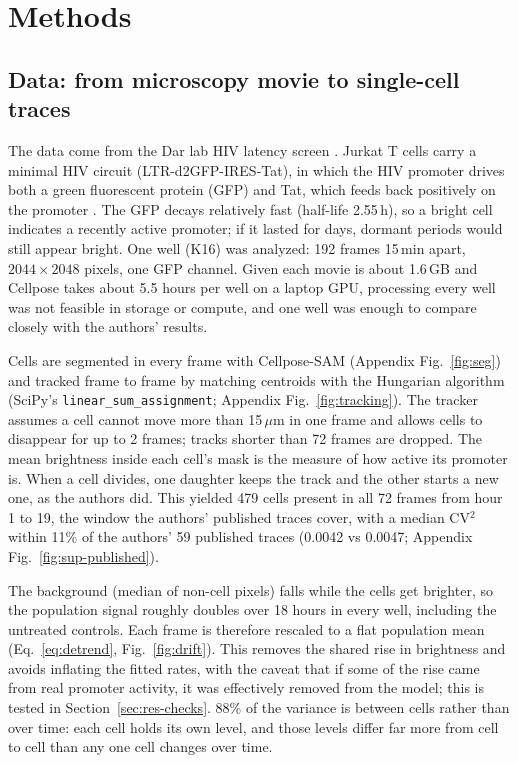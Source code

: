 \chapter{Methods}\label{ch:methods}

\section{Data: from microscopy movie to single-cell traces}\label{sec:data}

The data come from the Dar lab HIV latency screen \cite{lu2021,idb_dataset}. Jurkat T cells carry a minimal HIV circuit (LTR-d2GFP-IRES-Tat), in which the HIV promoter drives both a green fluorescent protein (GFP) and Tat, which feeds back positively on the promoter \cite{weinberger2005}. The GFP decays relatively fast (half-life 2.55\,h), so a bright cell indicates a recently active promoter; if it lasted for days, dormant periods would still appear bright. One well (K16) was analyzed: 192 frames 15\,min apart, $2044\times2048$ pixels, one GFP channel. Given each movie is about 1.6\,GB and Cellpose takes about 5.5 hours per well on a laptop GPU, processing every well was not feasible in storage or compute, and one well was enough to compare closely with the authors' results.

Cells are segmented in every frame with Cellpose-SAM \cite{pachitariu2025} (Appendix Fig.~\ref{fig:seg}) and tracked frame to frame by matching centroids with the Hungarian algorithm (SciPy's \texttt{linear\_sum\_assignment}; Appendix Fig.~\ref{fig:tracking}). The tracker assumes a cell cannot move more than 15\,$\mu$m in one frame and allows cells to disappear for up to 2 frames; tracks shorter than 72 frames are dropped. The mean brightness inside each cell's mask is the measure of how active its promoter is. When a cell divides, one daughter keeps the track and the other starts a new one, as the authors did. This yielded 479 cells present in all 72 frames from hour 1 to 19, the window the authors' published traces cover, with a median CV$^2$ within 11\% of the authors' 59 published traces (0.0042 vs 0.0047; Appendix Fig.~\ref{fig:sup-published}).

The background (median of non-cell pixels) falls while the cells get brighter, so the population signal roughly doubles over 18 hours in every well, including the untreated controls. Each frame is therefore rescaled to a flat population mean (Eq.~\eqref{eq:detrend}, Fig.~\ref{fig:drift}). This removes the shared rise in brightness and avoids inflating the fitted rates, with the caveat that if some of the rise came from real promoter activity, it was effectively removed from the model; this is tested in Section~\ref{sec:res-checks}. 88\% of the variance is between cells rather than over time: each cell holds its own level, and those levels differ far more from cell to cell than any one cell changes over time.

